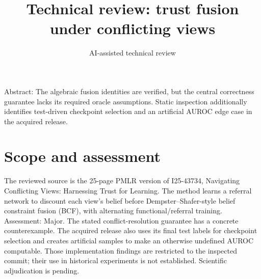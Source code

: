 \documentclass[10pt]{article}
\title{Technical review: trust fusion under conflicting views}
\author{AI-assisted technical review}
\date{}
\begin{document}
\maketitle
Abstract: The algebraic fusion identities are verified, but the central correctness guarantee lacks its required oracle assumptions. Static inspection additionally identifies test-driven checkpoint selection and an artificial AUROC edge case in the acquired release.\par
\section*{Scope and assessment}
The reviewed source is the 25-page PMLR version of I25-43734, Navigating Conflicting Views: Harnessing Trust for Learning. The method learns a referral network to discount each view’s belief before Dempster–Shafer-style belief constraint fusion (BCF), with alternating functional/referral training. Assessment: Major. The stated conflict-resolution guarantee has a concrete counterexample. The acquired release also uses its final test labels for checkpoint selection and creates artificial samples to make an otherwise undefined AUROC computable. Those implementation findings are restricted to the inspected commit; their use in historical experiments is not established. Scientific adjudication is pending.\par
\end{document}
